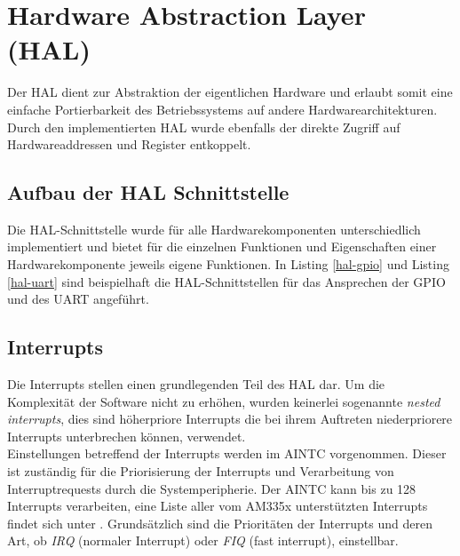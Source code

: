 \section{Hardware Abstraction Layer (HAL)}
\label{chapHAL}
Der \ac{HAL} dient zur Abstraktion der eigentlichen Hardware und erlaubt somit eine einfache Portierbarkeit des Betriebssystems auf andere Hardwarearchitekturen. Durch den implementierten \ac{HAL} wurde ebenfalls der direkte Zugriff auf Hardwareaddressen und Register entkoppelt.

\subsection{Aufbau der HAL Schnittstelle}
Die \ac{HAL}-Schnittstelle wurde für alle Hardwarekomponenten unterschiedlich implementiert und bietet für die einzelnen Funktionen und Eigenschaften einer Hardwarekomponente jeweils eigene Funktionen. In Listing \ref{hal-gpio} und Listing \ref{hal-uart} sind beispielhaft die \ac{HAL}-Schnittstellen für das Ansprechen der \ac{GPIO} und des \ac{UART} angeführt.\\





\subsection{Interrupts}

Die Interrupts stellen einen grundlegenden Teil des \ac{HAL} dar. Um die Komplexität der Software nicht zu erhöhen, wurden keinerlei sogenannte \emph{nested interrupts}, dies sind höherpriore Interrupts die bei ihrem Auftreten niederpriorere Interrupts unterbrechen können, verwendet.\\

Einstellungen betreffend der Interrupts werden im \ac{AINTC} vorgenommen. Dieser ist zuständig für die Priorisierung der Interrupts und Verarbeitung von Interruptrequests durch die Systemperipherie. Der \ac{AINTC} kann bis zu 128 Interrupts verarbeiten, eine Liste aller vom AM335x unterstützten Interrupts findet sich unter \cite[S. 199]{ARM:TRM}. Grundsätzlich sind die Prioritäten der Interrupts und deren Art, ob \emph{IRQ} (normaler Interrupt) oder \emph{FIQ} (fast interrupt), einstellbar.\\ 

